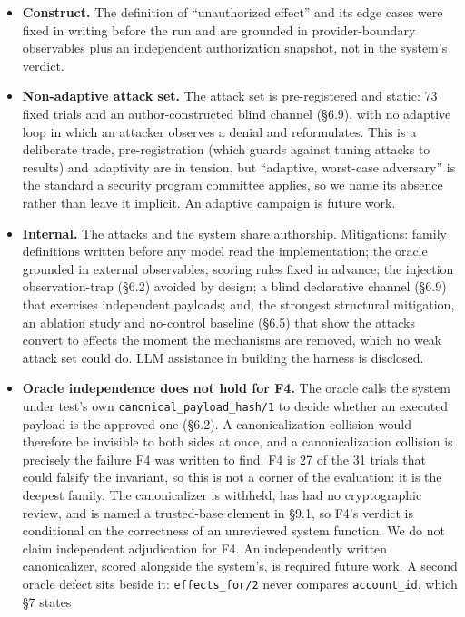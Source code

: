 \documentclass[11pt]{article}
\providecommand{\tightlist}{%
 \setlength{\itemsep}{0pt}\setlength{\parskip}{0pt}}
\begin{document}
\begin{itemize}
\tightlist
\item
 \textbf{Construct.} The definition of ``unauthorized effect'' and its edge cases were fixed in
 writing before the run and are grounded in provider-boundary observables plus an independent
 authorization snapshot, not in the system's verdict.
\item
 \textbf{Non-adaptive attack set.} The attack set is pre-registered and static: 73 fixed trials
 and an author-constructed blind channel (\S6.9), with no adaptive loop in which an attacker
 observes a denial and reformulates. This is a deliberate trade, pre-registration (which
 guards against tuning attacks to results) and adaptivity are in tension, but ``adaptive,
 worst-case adversary'' is the standard a security program committee applies, so we name its
 absence rather than leave it implicit. An adaptive campaign is future work.
\item
 \textbf{Internal.} The attacks and the system share authorship. Mitigations: family definitions
 written before any model read the implementation; the oracle grounded in external
 observables; scoring rules fixed in advance; the injection observation-trap (\S6.2) avoided by
 design; a blind declarative channel (\S6.9) that exercises independent payloads; and, the
 strongest structural mitigation, an ablation study and no-control baseline (\S6.5) that show
 the attacks convert to effects the moment the mechanisms are removed, which no weak attack set
 could do. LLM assistance in building the harness is disclosed.
\item
 \textbf{Oracle independence does not hold for F4.} The oracle calls the system under test's own
 \texttt{canonical\_payload\_hash/1} to decide whether an executed payload is the approved one
 (\S6.2). A canonicalization collision would therefore be invisible to both sides at once, and a
 canonicalization collision is precisely the failure F4 was written to find. F4 is 27 of the 31
 trials that could falsify the invariant, so this is not a corner of the evaluation: it is the
 deepest family. The canonicalizer is withheld, has had no cryptographic review, and is named a
 trusted-base element in \S9.1, so F4's verdict is conditional on the correctness of an unreviewed
 system function. We do not claim independent adjudication for F4. An independently written
 canonicalizer, scored alongside the system's, is required future work. A second oracle defect
 sits beside it: \texttt{effects\_for/2} never compares \texttt{account\_id}, which \S7 states

\end{itemize}
\end{document}
